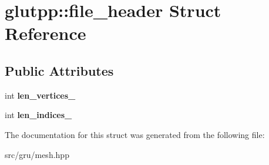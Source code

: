 \hypertarget{structglutpp_1_1file__header}{\section{glutpp\-:\-:file\-\_\-header \-Struct \-Reference}
\label{structglutpp_1_1file__header}
}
\subsection*{\-Public \-Attributes}
\begin{DoxyCompactItemize}
\item 
\hypertarget{structglutpp_1_1file__header_a1c927bc499e200233b20384922dd5f38}{int {\bfseries len\-\_\-vertices\-\_\-}}\label{structglutpp_1_1file__header_a1c927bc499e200233b20384922dd5f38}

\item 
\hypertarget{structglutpp_1_1file__header_adce5b53008586e16c7185c7846a9d153}{int {\bfseries len\-\_\-indices\-\_\-}}\label{structglutpp_1_1file__header_adce5b53008586e16c7185c7846a9d153}

\end{DoxyCompactItemize}


\-The documentation for this struct was generated from the following file\-:\begin{DoxyCompactItemize}
\item 
src/gru/mesh.\-hpp\end{DoxyCompactItemize}
